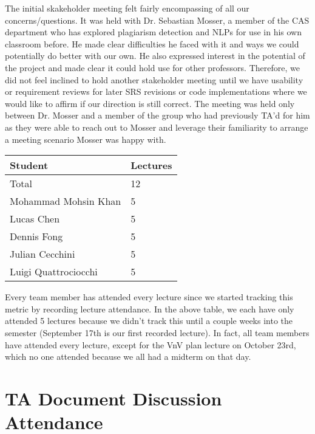 \documentclass{article}
\begin{document}
The initial skakeholder meeting felt fairly encompassing of all our concerns/questions. It was held
with Dr. Sebastian Mosser, a member of the CAS department who has explored plagiarism detection and NLPs
for use in his own classroom before. He made clear difficulties he faced with it and ways we could 
potentially do better with our own. He also expressed interest in the potential of the project and made clear
it could hold use for other professors. Therefore, we did not feel inclined to hold another stakeholder meeting
until we have usability or requirement reviews for later SRS revisions or code implementations where we would
like to affirm if our direction is still correct. The meeting was held only between Dr. Mosser and a member of the 
group who had previously TA'd for him as they were able to reach out to Mosser and leverage their familiarity
to arrange a meeting scenario Mosser was happy with.

\begin{table}[H]
\centering
\begin{tabular}{ll}
\toprule
\textbf{Student} & \textbf{Lectures}\\
\midrule
Total & 12\\
Mohammad Mohsin Khan & 5\\
Lucas Chen & 5\\
Dennis Fong & 5\\
Julian Cecchini & 5\\
Luigi Quattrociocchi & 5\\
\bottomrule
\end{tabular}
\end{table}

Every team member has attended every lecture since we started tracking
this metric by recording lecture attendance. In the above table, we each
have only attended 5 lectures because we didn't track this until a couple
weeks into the semester (September 17th is our first recorded lecture).
In fact, all team members have attended every lecture, except for the
VnV plan lecture on October 23rd, which no one attended because we all
had a midterm on that day.

\section{TA Document Discussion Attendance}
\end{document}
